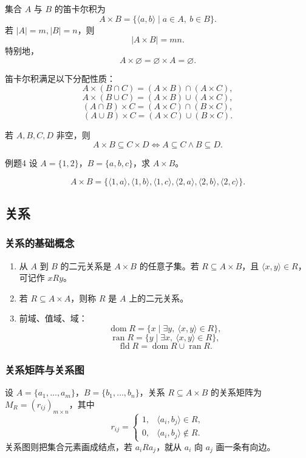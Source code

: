 集合 \(A\) 与 \(B\) 的笛卡尔积为
\[
A\times B=\{\langle a,b\rangle\mid a\in A,\ b\in B\}.
\]
若 \(|A|=m,|B|=n\)，则
\[
|A\times B|=mn.
\]
特别地，
\[
A\times\varnothing=\varnothing\times A=\varnothing.
\]

笛卡尔积满足以下分配性质：
\[
A\times(B\cap C)=(A\times B)\cap(A\times C),
\]
\[
A\times(B\cup C)=(A\times B)\cup(A\times C),
\]
\[
(A\cap B)\times C=(A\times C)\cap(B\times C),
\]
\[
(A\cup B)\times C=(A\times C)\cup(B\times C).
\]

若 \(A,B,C,D\) 非空，则
\[
A\times B\subseteq C\times D\Leftrightarrow A\subseteq C\land B\subseteq D.
\]

\begin{question}{例题4}
	设 \(A=\{1,2\}\)，\(B=\{a,b,c\}\)，求 \(A\times B\)。
	
	\begin{solution}
	\[
	A\times B=\{\langle1,a\rangle,\langle1,b\rangle,\langle1,c\rangle,\langle2,a\rangle,\langle2,b\rangle,\langle2,c\rangle\}.
	\]
	\end{solution}
\end{question}

\subsection{关系}

\subsubsection{关系的基础概念}

\begin{enumerate}
	\item 从 \(A\) 到 \(B\) 的二元关系是 \(A\times B\) 的任意子集。若 \(R\subseteq A\times B\)，且 \(\langle x,y\rangle\in R\)，可记作 \(xRy\)。
	\item 若 \(R\subseteq A\times A\)，则称 \(R\) 是 \(A\) 上的二元关系。
	\item 前域、值域、域：
	\[
	\operatorname{dom}R=\{x\mid \exists y,\ \langle x,y\rangle\in R\},
	\]
	\[
	\operatorname{ran}R=\{y\mid \exists x,\ \langle x,y\rangle\in R\},
	\]
	\[
	\operatorname{fld}R=\operatorname{dom}R\cup\operatorname{ran}R.
	\]
\end{enumerate}

\subsubsection{关系矩阵与关系图}

设 \(A=\{a_1,\dots,a_m\}\)，\(B=\{b_1,\dots,b_n\}\)，关系 \(R\subseteq A\times B\) 的关系矩阵为 \(M_R=(r_{ij})_{m\times n}\)，其中
\[
r_{ij}=
\begin{cases}
1,&\langle a_i,b_j\rangle\in R,\\
0,&\langle a_i,b_j\rangle\notin R.
\end{cases}
\]
关系图则把集合元素画成结点，若 \(a_iRa_j\)，就从 \(a_i\) 向 \(a_j\) 画一条有向边。

